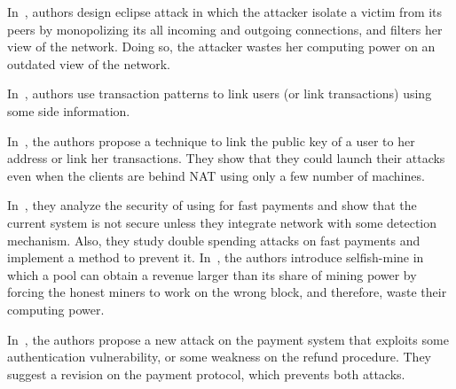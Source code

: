 In~\cite{eclipse}, authors design eclipse attack in which the attacker isolate a victim from its peers by monopolizing its all incoming and outgoing connections, and filters her view of the network. Doing so, the attacker wastes her computing power on an outdated view of the network.

In~\cite{analysis_anon,privacy_anon,struct,fist,quant}, authors use \bc transaction patterns
to link users (or link transactions) using some side information.%

In~\cite{deanom1}, the authors propose a technique to link the public key of a user to her address or link her transactions. They show that they could launch their attacks even when the clients are behind NAT using only a few number of machines.
 
 In~\cite{double}, they analyze the security of using \bc for fast payments and show that the current \bc system is not secure unless they integrate \bc network with some detection mechanism.
 Also, they study double spending attacks on fast payments and  implement a method to prevent it.
 In~\cite{majority}, the authors introduce selfish-mine in which a pool can obtain a revenue larger than its share of mining power by forcing the honest miners to work on the wrong block, and therefore, waste their computing power.
 
 
 
In~\cite{refund}, the authors propose a new attack on the \bc payment system that exploits some authentication vulnerability, or some weakness on the refund procedure. They suggest a revision on the \bc payment protocol, which prevents both attacks.




